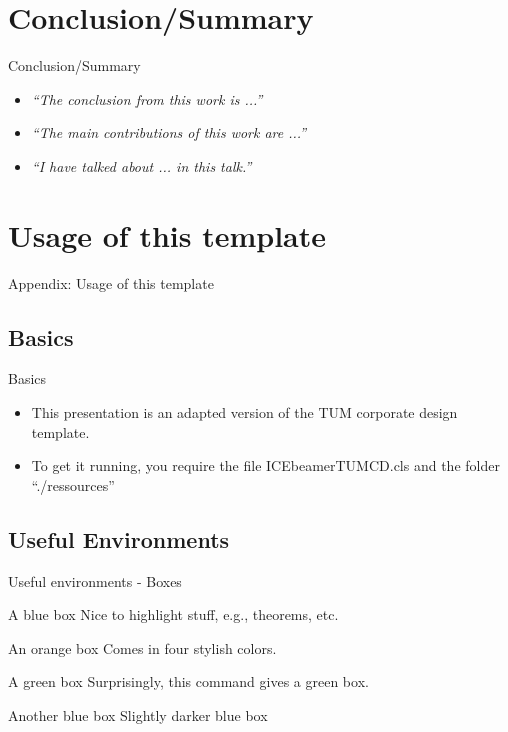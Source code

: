 \documentclass[english,169,helvet]{ICEbeamerTUMCD}
\begin{document}
\section{Conclusion/Summary}
\begin{frame}{Conclusion/Summary}
  \begin{itemize}
  \item \textit{``The conclusion from this work is ...''}
  \item \textit{``The main contributions of this work are ...''}
  \item \textit{``I have talked about ... in this talk.''}
  \end{itemize}
\end{frame}

\appendix
\section{Usage of this template}
\begin{frame}{Appendix: Usage of this template}
\end{frame}

\subsection{Basics}
\begin{frame}{Basics}
  \begin{itemize}
  \item This presentation is an adapted version of the TUM corporate design template.
  \item To get it running, you require the file ICEbeamerTUMCD.cls and the folder ``./ressources''
  \end{itemize}
\end{frame}
\subsection{Useful Environments}
\begin{frame}{Useful environments - Boxes}
    \begin{bluebox}{A blue box}
      Nice to highlight stuff, e.g., theorems, etc.
    \end{bluebox}
    \begin{orangebox}{An orange box}
      Comes in four stylish colors.
    \end{orangebox}
    \begin{greenbox}{A green box}
      Surprisingly, this command gives a green box.
    \end{greenbox}
    \begin{darkbluebox}{Another blue box}
      Slightly darker blue box
    \end{darkbluebox}
\end{frame}
\end{document}
